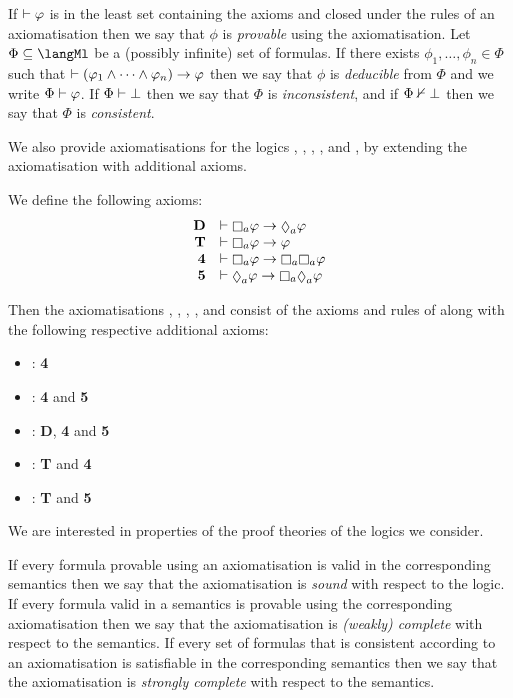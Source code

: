 If $\vdash \varphi$ is in the least set containing the axioms and closed under the rules of an axiomatisation then we say that $\phi$ is {\em provable} using the axiomatisation.
Let $\Phi \subseteq \langMl$ be a (possibly infinite) set of formulas.
If there exists $\phi_1, \dots, \phi_n \in \Phi$ such that $\vdash (\varphi_1 \land \cdots \land \varphi_n) \rightarrow \varphi$ then we say that $\phi$ is {\em deducible} from $\Phi$ and we write $\Phi \vdash \varphi$.
If $\Phi \vdash \bot$ then we say that $\Phi$ is {\em inconsistent}, and if $\Phi \nvdash \bot$ then we say that $\Phi$ is {\em consistent}.

We also provide axiomatisations for the logics \logicKF{}, \logicKFF{}, \logicKD{}, \logicSF{}, and \logicS{}, by extending the axiomatisation \axiomK{} with additional axioms.

\begin{definition}
We define the following axioms:
$$
\begin{array}{rl}
    {\bf D}     & \proves \necessaryA \phi \implies \possibleA \phi\\
    {\bf T}     & \proves \necessaryA \phi \implies \phi\\
    {\bf 4}     & \proves \necessaryA \phi \implies \necessaryA \necessaryA \phi\\
    {\bf 5}     & \proves \possibleA \phi \implies \necessaryA \possibleA \phi
\end{array}
$$

Then the axiomatisations \axiomKF{}, \axiomKFF{}, \axiomKD{}, \axiomSF{}, and \axiomS{} consist of the axioms and rules of \axiomK{} along with the following respective additional axioms:
\begin{itemize}
    \item \axiomKF{}: {\bf 4}
    \item \axiomKFF{}: {\bf 4} and {\bf 5}
    \item \axiomKD{}: {\bf D}, {\bf 4} and {\bf 5}
    \item \axiomSF{}: {\bf T} and {\bf 4}
    \item \axiomS{}: {\bf T} and {\bf 5}
\end{itemize}
\end{definition}

We are interested in properties of the proof theories of the logics we consider.

\begin{definition}
If every formula provable using an axiomatisation is valid in the corresponding semantics then we say that the axiomatisation is {\em sound} with respect to the logic.
If every formula valid in a semantics is provable using the corresponding axiomatisation then we say that the axiomatisation is {\em (weakly) complete} with respect to the semantics.
If every set of formulas that is consistent according to an axiomatisation is satisfiable in the corresponding semantics then we say that the axiomatisation is {\em strongly complete} with respect to the semantics.
\end{definition}

